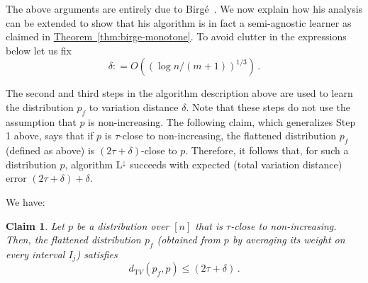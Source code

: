 \documentclass[10pt]{article}
\newtheorem{claim}[theorem]{Claim}
\theoremstyle{definition}
\numberwithin{equation}{section}
\newcommand{\expref}[2]{\texorpdfstring{\hyperref[#2]{#1~\ref{#2}}}{#1~\ref{#2}}}
\newcommand{\dtv}{d_{\mathrm TV}}
\newcommand{\ANI}{{\mathrm{L^{\downarrow}}}}
\begin{document}
\medskip

The above arguments are entirely due to Birg{\'e}~\cite{Birge:87b}.
We now explain how his analysis can be extended to show that his algorithm is
in fact a semi-agnostic learner as claimed in \expref{Theorem}{thm:birge-monotone}.
To avoid clutter in the expressions below let us fix
\[
\delta: =O\left( ({\log n / (m+1)})^{1/3} \right)\,.
\]

The second and third steps in the algorithm description
above are used to learn the distribution $p_f$ to variation distance $\delta$.
Note that these steps do not use the assumption that $p$ is non-increasing.
The following claim, which generalizes Step 1 above, says that if $p$ is $\tau$-close to non-increasing,
the flattened distribution $p_f$ (defined as above) is $(2\tau+\delta)$-close to $p$.
Therefore, it follows that, for such a distribution $p$,
algorithm $\ANI$ succeeds with expected (total variation distance) error
$(2\tau+\delta)+\delta$.

\noindent We have:

\begin{claim}
Let $p$ be a distribution over $[n]$ that is $\tau$-close to non-increasing.
Then, the flattened distribution $p_f$ (obtained from $p$ by averaging its
weight on every interval $I_j$) satisfies
\[
\dtv(p_f,p) \leq (2\tau+\delta)\,.
\]
\end{claim}
\end{document}
